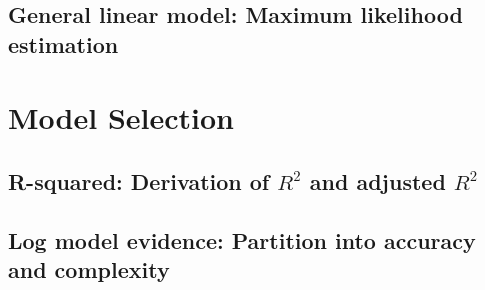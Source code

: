 \documentclass[a4paper,12pt]{book}
\begin{document}
\section{General linear model: Maximum likelihood estimation}



\chapter{Model Selection} \newpage

\section{R-squared: Derivation of $R^2$ and adjusted $R^2$}


\section{Log model evidence: Partition into accuracy and complexity}

\end{document}
